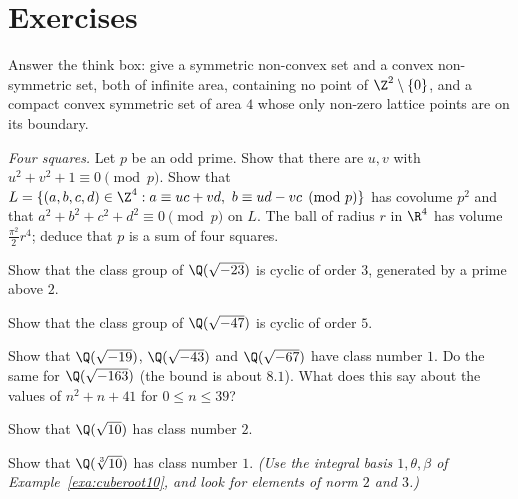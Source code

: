 \section{Exercises}

\begin{exercise}[$\star$]\label{ex:convexity}
Answer the think box: give a symmetric non-convex set and a convex non-symmetric set, both of infinite area, containing no
point of $\Z^2\setminus\{0\}$, and a compact convex symmetric set of area $4$ whose only non-zero lattice points are on its
boundary.
\end{exercise}

\begin{exercise}[$\star\star$]\label{ex:foursq}
\emph{Four squares.} Let $p$ be an odd prime. Show that there are $u,v$ with $u^2+v^2+1\equiv0\pmod p$. Show that
$L=\{(a,b,c,d)\in\Z^4:a\equiv uc+vd,\ b\equiv ud-vc\pmod p\}$ has covolume $p^2$ and that $a^2+b^2+c^2+d^2\equiv0\pmod p$
on $L$. The ball of radius $r$ in $\R^4$ has volume $\frac{\pi^2}2r^4$; deduce that $p$ is a sum of four squares.
\end{exercise}

\begin{exercise}[$\star\star$]\label{ex:h23}
Show that the class group of $\Q(\sqrt{-23})$ is cyclic of order $3$, generated by a prime above $2$.
\end{exercise}

\begin{exercise}[$\star\star$]\label{ex:h47}
Show that the class group of $\Q(\sqrt{-47})$ is cyclic of order $5$.
\end{exercise}

\begin{exercise}[$\star$]\label{ex:h1}
Show that $\Q(\sqrt{-19})$, $\Q(\sqrt{-43})$ and $\Q(\sqrt{-67})$ have class number $1$. Do the same for $\Q(\sqrt{-163})$
(the bound is about $8.1$). What does this say about the values of $n^2+n+41$ for $0\le n\le39$?
\end{exercise}

\begin{exercise}[$\star\star$]\label{ex:sqrt10}
Show that $\Q(\sqrt{10})$ has class number $2$.
\end{exercise}

\begin{exercise}[$\star\star$]\label{ex:h10}
Show that $\Q(\sqrt[3]{10})$ has class number $1$. \emph{(Use the integral basis $1,\theta,\beta$ of
Example~\ref{exa:cuberoot10}, and look for elements of norm $2$ and $3$.)}
\end{exercise}

